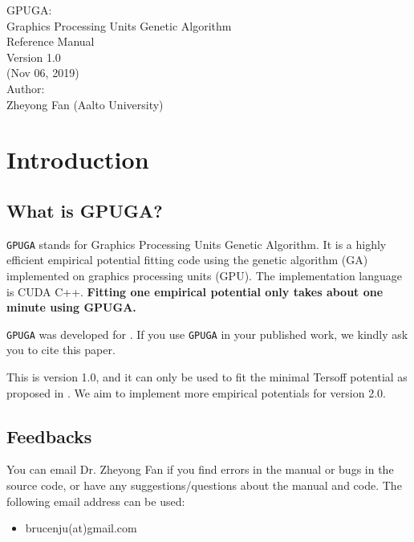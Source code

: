 \documentclass[12pt,a4paper]{report}
\begin{document}
\begin{center}
  \huge
  {
   \vspace*{1.0cm}
   GPUGA: \\
   Graphics Processing Units Genetic Algorithm \\
   \vspace*{1.0cm}
   Reference Manual\\
   \vspace*{1.0cm}
   Version 1.0 \\
   \vspace*{1.0cm}
   (Nov 06, 2019)\\
  \vspace*{2.0cm}
  }
  \large
  {
  Author: \\
  Zheyong Fan (Aalto University)\\
  }
  \vspace*{1.0cm}
\end{center}

\tableofcontents

\chapter{Introduction\label{chapter:introduction}}

\section{What is GPUGA?}

\verb"GPUGA" stands for Graphics Processing Units Genetic Algorithm. It is a highly efficient empirical potential fitting code using the genetic algorithm (GA) implemented on graphics processing units (GPU). The implementation language is CUDA C++. \textbf{Fitting one empirical potential only takes about one minute using GPUGA. }

\verb"GPUGA" was developed for \cite{fan2019arxiv}. If you use \verb"GPUGA" in your published work, we kindly ask you to cite this paper.

This is version 1.0, and it can only be used to fit the minimal Tersoff potential as proposed in \cite{fan2019arxiv}. We aim to implement more empirical potentials for version 2.0.

\section{Feedbacks}

You can email Dr. Zheyong Fan if you find errors in the manual or bugs in the source code, or have any suggestions/questions about the manual and code. The following email address can be used:
\begin{itemize}
\item brucenju(at)gmail.com
\end{itemize}
\end{document}
